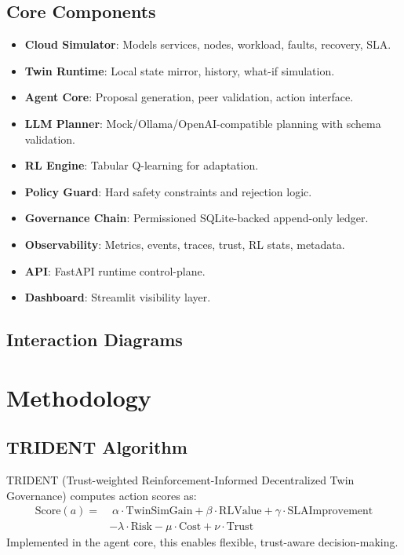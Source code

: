 \documentclass[conference]{IEEEtran}
\begin{document}
\subsection{Core Components}
\begin{itemize}
    \item \textbf{Cloud Simulator}: Models services, nodes, workload, faults, recovery, SLA.
    \item \textbf{Twin Runtime}: Local state mirror, history, what-if simulation.
    \item \textbf{Agent Core}: Proposal generation, peer validation, action interface.
    \item \textbf{LLM Planner}: Mock/Ollama/OpenAI-compatible planning with schema validation.
    \item \textbf{RL Engine}: Tabular Q-learning for adaptation.
    \item \textbf{Policy Guard}: Hard safety constraints and rejection logic.
    \item \textbf{Governance Chain}: Permissioned SQLite-backed append-only ledger.
    \item \textbf{Observability}: Metrics, events, traces, trust, RL stats, metadata.
    \item \textbf{API}: FastAPI runtime control-plane.
    \item \textbf{Dashboard}: Streamlit visibility layer.
\end{itemize}

\subsection{Interaction Diagrams}

\section{Methodology}
\subsection{TRIDENT Algorithm}
TRIDENT (Trust-weighted Reinforcement-Informed Decentralized Twin Governance) computes action scores as:
\begin{align*}
\text{Score}(a) = &\; \alpha \cdot \text{TwinSimGain} + \beta \cdot \text{RLValue} + \gamma \cdot \text{SLAImprovement} \\
& - \lambda \cdot \text{Risk} - \mu \cdot \text{Cost} + \nu \cdot \text{Trust}
\end{align*}
Implemented in the agent core, this enables flexible, trust-aware decision-making.
\end{document}
